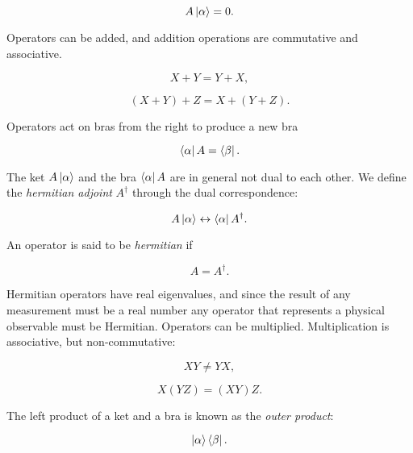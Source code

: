 \begin{equation}
 A \ket{\alpha} = 0 .
\end{equation}

Operators can be added, and addition operations are commutative and associative.

\begin{equation}
 X + Y = Y + X ,
\end{equation}

\begin{equation}
 (X + Y) + Z = X + (Y + Z) .
\end{equation}

\par
Operators act on bras from the right to produce a new bra

\begin{equation}
 \bra{\alpha} A = \bra{\beta} .
\end{equation}

The ket $A \ket{\alpha}$ and the bra $\bra{\alpha} A$ are in general
not dual to each other. We define the \textit{hermitian adjoint} $A^{\dagger}$
through the dual correspondence:

\begin{equation}
 A \ket{\alpha} \leftrightarrow \bra{\alpha} A^{\dagger} .
\end{equation}

An operator is said to be \textit{hermitian} if

\begin{equation}
 A = A^{\dagger} .
\end{equation}

Hermitian operators have real eigenvalues, and since the result
of any measurement must be a real number any operator that
represents a physical observable must be Hermitian.
\newline
Operators can be multiplied. Multiplication is associative, but non-commutative:

\begin{equation}
 XY \neq YX ,
\end{equation}

\begin{equation}
 X(YZ) = (XY)Z .
\end{equation}

The left product of a ket and a bra is known as the \textit{outer product}:

\begin{equation}
 \ket{\alpha} \bra{\beta} .
\end{equation}

